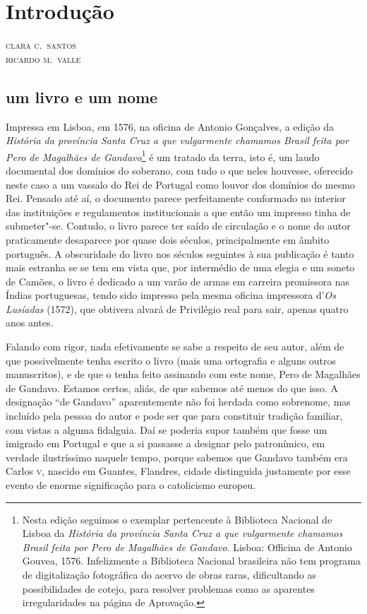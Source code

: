 
\chapter[Introdução, \emph{por Clara C.~Santos e Ricardo M.~Valle}]{Introdução}

\begin{flushright}
\textsc{clara c.~santos\\ricardo m.~valle}
\end{flushright}

\section{um livro e um nome}

\noindent{}Impressa em Lisboa, em 1576, na oficina de Antonio Gonçalves, a edição
da \textit{História da província Santa Cruz a que vulgarmente chamamos Brasil
feita por Pero de Magalhães de Gandavo}\footnote{ Nesta edição
seguimos o exemplar pertencente à Biblioteca Nacional de Lisboa da
\textit{História da província Santa Cruz a que vulgarmente chamamos Brasil
feita por Pero de Magalhães de Gandavo}. Lisboa: Officina de Antonio
Gouvea, 1576. Infelizmente a Biblioteca Nacional brasileira não tem
programa de digitalização fotográfica do acervo de obras raras,
dificultando as possibilidades de cotejo, para resolver problemas como
as aparentes irregularidades na página de Aprovação.} é um tratado da terra, isto
é, um laudo documental dos domínios do soberano, com tudo o que neles
houvesse, oferecido neste caso a um vassalo do Rei de Portugal como
louvor dos domínios do mesmo Rei. Pensado até aí, o documento parece
perfeitamente conformado no interior das instituições e regulamentos
institucionais a que então um impresso tinha de submeter"-se. Contudo, o
livro parece ter saído de circulação e o nome do autor praticamente
desaparece por quase dois séculos, principalmente em âmbito português.
A obscuridade do livro nos séculos seguintes à sua publicação é tanto
mais estranha se se tem em vista que, por intermédio de uma elegia e um
soneto de Camões, o livro é dedicado a um varão de armas em carreira
promissora nas Índias portuguesas, tendo sido impresso pela mesma
oficina impressora d'\textit{Os Lusíadas} (1572), que obtivera
alvará de Privilégio real para sair, apenas quatro anos antes.

Falando com rigor, nada efetivamente se sabe a respeito de seu autor,
além de que possivelmente tenha escrito o livro (mais uma ortografia e
alguns outros manuscritos), e de que o tenha feito assinando com este
nome, Pero de Magalhães de Gandavo. Estamos certos, aliás, de que
sabemos até menos do que isso. A designação ``de Gandavo'' 
aparentemente não foi herdada como sobrenome, mas incluído pela pessoa 
do autor e pode ser que para constituir tradição familiar, com vistas a alguma 
fidalguia. Daí se poderia supor também que fosse um imigrado em Portugal 
e que a si passasse a designar pelo patronímico, em verdade ilustríssimo naquele tempo, 
porque sabemos que Gandavo também era Carlos \textsc{v}, nascido em Guantes, 
Flandres, cidade distinguida justamente por esse evento de enorme 
significação para o catolicismo europeu.

